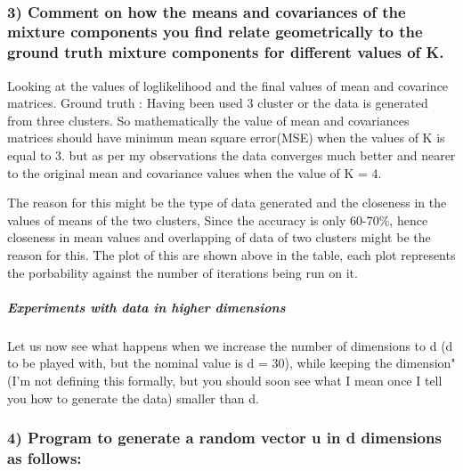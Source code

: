 \documentclass[11pt]{article}
\begin{document}
    \begin{center}
    \end{center}
    { \hspace*{\fill} \\}
    
    \subsubsection{3) Comment on how the means and covariances of the
mixture components you find relate geometrically to the ground truth
mixture components for different values of
K.}\label{comment-on-how-the-means-and-covariances-of-the-mixture-components-you-find-relate-geometrically-to-the-ground-truth-mixture-components-for-different-values-of-k.}

    Looking at the values of loglikelihood and the final values of mean and
covarince matrices. Ground truth : Having been used 3 cluster or the
data is generated from three clusters. So mathematically the value of
mean and covariances matrices should have minimun mean square error(MSE)
when the values of K is equal to 3. but as per my observations the data
converges much better and nearer to the original mean and covariance
values when the value of K = 4.

The reason for this might be the type of data generated and the
closeness in the values of means of the two clusters, Since the accuracy
is only 60-70\%, hence closeness in mean values and overlapping of data
of two clusters might be the reason for this. The plot of this are shown
above in the table, each plot represents the porbability against the
number of iterations being run on it.

    \subparagraph{Experiments with data in higher
dimensions}\label{experiments-with-data-in-higher-dimensions}

Let us now see what happens when we increase the number of dimensions to
d (d to be played with, but the nominal value is d = 30), while keeping
the \effective dimension" (I'm not defining this formally, but you
should soon see what I mean once I tell you how to generate the data)
smaller than d.

\subsubsection{4) Program to generate a random vector u in d dimensions
as
follows:}\label{program-to-generate-a-random-vector-u-in-d-dimensions-as-follows}
\end{document}
